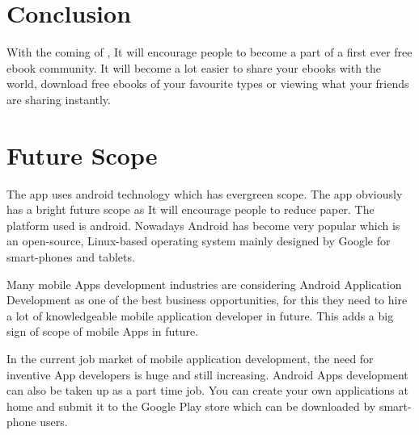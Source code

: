 \section{Conclusion}
With the coming of \appName, It will encourage people to become a part of a first ever free ebook community. It will become a lot easier to share your ebooks with the world, download free ebooks of your favourite types or viewing what your friends are sharing instantly.

\section{Future Scope}
The app uses android technology which has evergreen scope. The app obviously
has a bright future scope as It will encourage people to reduce paper. The platform used is android. Nowadays Android has become very popular which is an open-source, Linux-based operating system mainly designed by Google for smart-phones and tablets.

Many mobile Apps development industries are considering Android Application
Development as one of the best business opportunities, for this they need to
hire a lot of knowledgeable mobile application developer in future. This adds a
big sign of scope of mobile Apps in future.

In the current job market of mobile application development, the need for inventive
App developers is huge and still increasing. Android Apps development can also
be taken up as a part time job. You can create your own applications at home and
submit it to the Google Play store which can be downloaded by smart-phone users.